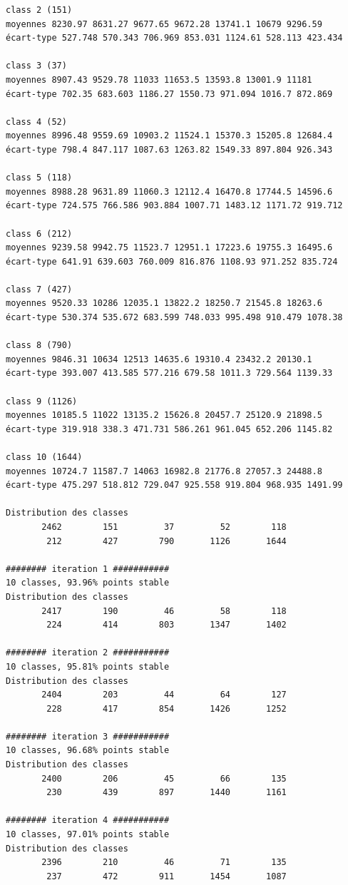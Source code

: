 \documentclass[earth,article,submit,pdftex,moreauthors]{Definitions/mdpi}
\begin{document}
\begin{scriptsize}
\begin{verbatim}
class 2 (151)
moyennes 8230.97 8631.27 9677.65 9672.28 13741.1 10679 9296.59
écart-type 527.748 570.343 706.969 853.031 1124.61 528.113 423.434

class 3 (37)
moyennes 8907.43 9529.78 11033 11653.5 13593.8 13001.9 11181
écart-type 702.35 683.603 1186.27 1550.73 971.094 1016.7 872.869

class 4 (52)
moyennes 8996.48 9559.69 10903.2 11524.1 15370.3 15205.8 12684.4
écart-type 798.4 847.117 1087.63 1263.82 1549.33 897.804 926.343

class 5 (118)
moyennes 8988.28 9631.89 11060.3 12112.4 16470.8 17744.5 14596.6
écart-type 724.575 766.586 903.884 1007.71 1483.12 1171.72 919.712

class 6 (212)
moyennes 9239.58 9942.75 11523.7 12951.1 17223.6 19755.3 16495.6
écart-type 641.91 639.603 760.009 816.876 1108.93 971.252 835.724

class 7 (427)
moyennes 9520.33 10286 12035.1 13822.2 18250.7 21545.8 18263.6
écart-type 530.374 535.672 683.599 748.033 995.498 910.479 1078.38

class 8 (790)
moyennes 9846.31 10634 12513 14635.6 19310.4 23432.2 20130.1
écart-type 393.007 413.585 577.216 679.58 1011.3 729.564 1139.33

class 9 (1126)
moyennes 10185.5 11022 13135.2 15626.8 20457.7 25120.9 21898.5
écart-type 319.918 338.3 471.731 586.261 961.045 652.206 1145.82

class 10 (1644)
moyennes 10724.7 11587.7 14063 16982.8 21776.8 27057.3 24488.8
écart-type 475.297 518.812 729.047 925.558 919.804 968.935 1491.99

Distribution des classes
       2462        151         37         52        118
        212        427        790       1126       1644

######## iteration 1 ###########
10 classes, 93.96% points stable
Distribution des classes
       2417        190         46         58        118
        224        414        803       1347       1402

######## iteration 2 ###########
10 classes, 95.81% points stable
Distribution des classes
       2404        203         44         64        127
        228        417        854       1426       1252

######## iteration 3 ###########
10 classes, 96.68% points stable
Distribution des classes
       2400        206         45         66        135
        230        439        897       1440       1161

######## iteration 4 ###########
10 classes, 97.01% points stable
Distribution des classes
       2396        210         46         71        135
        237        472        911       1454       1087


\end{verbatim}
\end{scriptsize}
\end{document}
